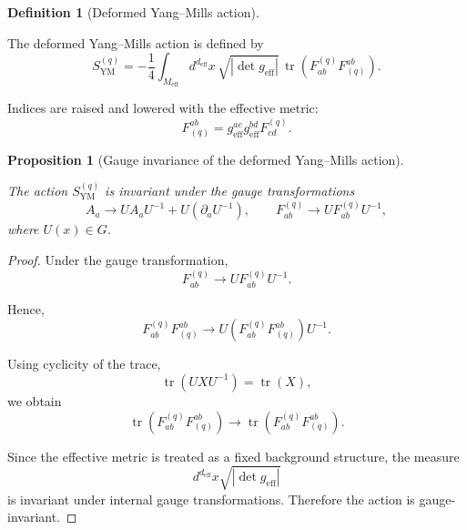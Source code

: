 \documentclass[12pt,a4paper]{article}
\theoremstyle{plain}
\newtheorem{proposition}[theorem]{Proposition}
\theoremstyle{definition}
\newtheorem{definition}[theorem]{Definition}
\begin{document}
\begin{definition}[Deformed Yang--Mills action]
\label{def:YM_action}

The deformed Yang--Mills action is defined by
\begin{equation}
\label{eq:YM_action}
S_{\mathrm{YM}}^{(q)}
=
-\frac14
\int_{M_{\mathrm{eff}}}
d^{d_{\mathrm{eff}}}x\,
\sqrt{
\left|
\det g_{\mathrm{eff}}
\right|
}
\,
\operatorname{tr}
\left(
F_{ab}^{(q)}
F_{(q)}^{ab}
\right).
\end{equation}

Indices are raised and lowered with the effective metric:
\begin{equation}
F_{(q)}^{ab}
=
g_{\mathrm{eff}}^{ac}
g_{\mathrm{eff}}^{bd}
F_{cd}^{(q)}.
\label{eq:F_raised}
\end{equation}

\end{definition}

\begin{proposition}[Gauge invariance of the deformed Yang--Mills action]
\label{prop:YM_gauge_invariance}

The action \(S_{\mathrm{YM}}^{(q)}\) is invariant under the gauge transformations
\begin{equation}
A_a
\longrightarrow
U A_a U^{-1}
+
U(\partial_a U^{-1}),
\qquad
F_{ab}^{(q)}
\longrightarrow
U F_{ab}^{(q)} U^{-1},
\label{eq:gauge_transform_YM}
\end{equation}
where \(U(x)\in G\).

\end{proposition}

\begin{proof}

Under the gauge transformation,
\[
F_{ab}^{(q)}
\longrightarrow
U F_{ab}^{(q)} U^{-1}.
\]

Hence,
\[
F_{ab}^{(q)}F_{(q)}^{ab}
\longrightarrow
U
\left(
F_{ab}^{(q)}F_{(q)}^{ab}
\right)
U^{-1}.
\]

Using cyclicity of the trace,
\[
\operatorname{tr}(UXU^{-1})
=
\operatorname{tr}(X),
\]
we obtain
\[
\operatorname{tr}
\left(
F_{ab}^{(q)}F_{(q)}^{ab}
\right)
\longrightarrow
\operatorname{tr}
\left(
F_{ab}^{(q)}F_{(q)}^{ab}
\right).
\]

Since the effective metric is treated as a fixed background structure, the measure
\[
d^{d_{\mathrm{eff}}}x
\sqrt{
\left|
\det g_{\mathrm{eff}}
\right|
}
\]
is invariant under internal gauge transformations. Therefore the action is gauge-invariant.

\end{proof}
\end{document}
